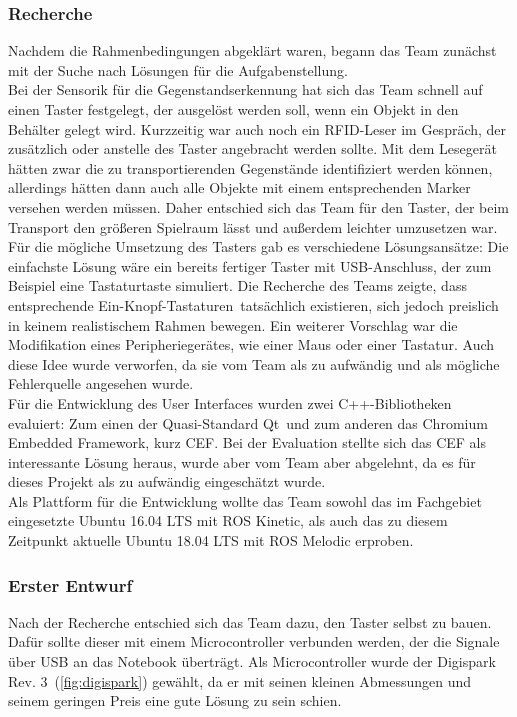 \documentclass[a4paper,12pt,headsepline]{scrartcl}
\begin{document}
	\subsubsection{Recherche}
		Nachdem die Rahmenbedingungen abgeklärt waren, begann das Team zunächst mit der Suche nach Lösungen für die Aufgabenstellung.\\
		Bei der Sensorik für die Gegenstandserkennung hat sich das Team schnell auf einen Taster festgelegt, der ausgelöst werden soll, wenn ein Objekt in den Behälter gelegt wird. Kurzzeitig war auch noch ein RFID-Leser im Gespräch, der zusätzlich oder anstelle des Taster angebracht werden sollte. Mit dem Lesegerät hätten zwar die zu transportierenden Gegenstände identifiziert werden können, allerdings hätten dann auch alle Objekte mit einem entsprechenden Marker versehen werden müssen. Daher entschied sich das Team für den Taster, der beim Transport den größeren Spielraum lässt und außerdem leichter umzusetzen war. \\
		Für die mögliche Umsetzung des Tasters gab es verschiedene Lösungsansätze: Die einfachste Lösung wäre ein bereits fertiger Taster mit USB-Anschluss, der zum Beispiel eine Tastaturtaste simuliert. Die Recherche des Teams zeigte, dass entsprechende \glqq Ein-Knopf-Tastaturen\grqq\ tatsächlich existieren, sich jedoch preislich in keinem realistischem Rahmen bewegen. Ein weiterer Vorschlag war die Modifikation eines Peripheriegerätes, wie einer Maus oder einer Tastatur. Auch diese Idee wurde verworfen, da sie vom Team als zu aufwändig und als mögliche Fehlerquelle angesehen wurde. \\
		Für die Entwicklung des User Interfaces wurden zwei C++-Bibliotheken evaluiert: Zum einen der Quasi-Standard \glqq Qt\grqq\ und zum anderen das \glqq Chromium Embedded Framework\grqq , kurz CEF. Bei der Evaluation stellte sich das CEF als interessante Lösung heraus, wurde aber vom Team aber abgelehnt, da es für dieses Projekt als zu aufwändig eingeschätzt wurde.\\
		Als Plattform für die Entwicklung wollte das Team sowohl das im Fachgebiet eingesetzte Ubuntu 16.04 LTS mit ROS Kinetic, als auch das zu diesem Zeitpunkt aktuelle Ubuntu 18.04 LTS mit ROS Melodic erproben.

	\subsubsection{Erster Entwurf}	
		Nach der Recherche entschied sich das Team dazu, den Taster selbst zu bauen. Dafür sollte dieser mit einem Microcontroller verbunden werden, der die Signale über USB an das Notebook überträgt. Als Microcontroller wurde der \glqq Digispark Rev. 3\grqq\ (\cref{fig:digispark}) gewählt, da er mit seinen kleinen Abmessungen und seinem geringen Preis eine gute Lösung zu sein schien. 
\end{document}
